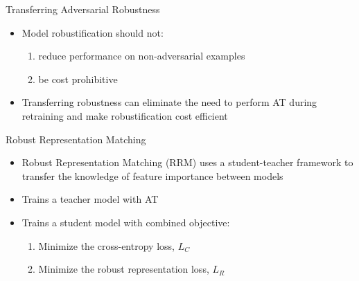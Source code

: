 \documentclass{beamer}
\begin{document}

\begin{frame}{Transferring Adversarial Robustness}
	
	\begin{itemize}
	\item Model robustification should not:
	\begin{enumerate}
		\item reduce performance on non-adversarial examples
		\item be cost prohibitive
	\end{enumerate}
	\item Transferring robustness can eliminate the need to perform AT during retraining and make robustification cost efficient
\end{itemize}
	
\end{frame}


\begin{frame}{Robust Representation Matching}
	
	\begin{itemize}
		\item Robust Representation Matching (RRM) uses a student-teacher framework to transfer the knowledge of feature importance between models
		\item Trains a teacher model with AT
		\item Trains a student model with combined objective:
		\begin{enumerate}
			\item Minimize the cross-entropy loss, $L_C$
			\item Minimize the robust representation loss, $L_R$
		\end{enumerate}
	\end{itemize}
	
\end{frame}

\end{document}
